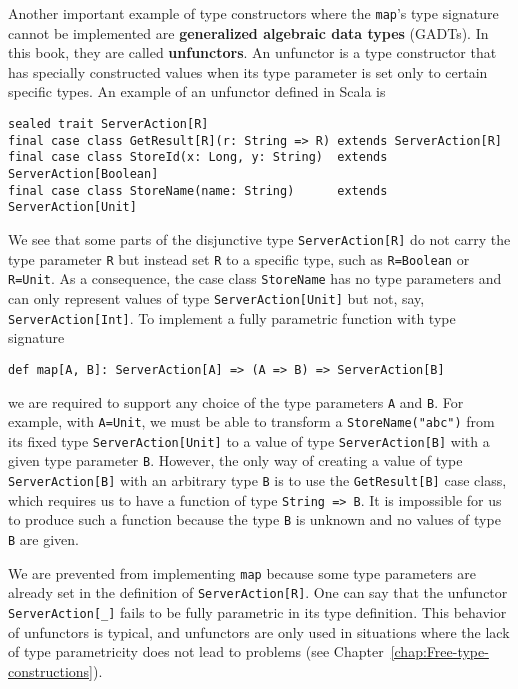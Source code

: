 Another important example of type constructors where the \lstinline!map!'s
type signature cannot be implemented are \textbf{generalized
algebraic data types} (GADTs). In this book, they are
called \textbf{unfunctors}. An unfunctor is a type
constructor that has specially constructed values when its type parameter
is set only to certain specific types. An example of an unfunctor
defined in Scala is
\begin{lstlisting}
sealed trait ServerAction[R]
final case class GetResult[R](r: String => R) extends ServerAction[R]
final case class StoreId(x: Long, y: String)  extends ServerAction[Boolean]
final case class StoreName(name: String)      extends ServerAction[Unit]
\end{lstlisting}
We see that some parts of the disjunctive type \lstinline!ServerAction[R]!
do not carry the type parameter \lstinline!R! but instead set \lstinline!R!
to a specific type, such as \lstinline!R=Boolean! or \lstinline!R=Unit!.
As a consequence, the case class \lstinline!StoreName! has no type
parameters and can only represent values of type \lstinline!ServerAction[Unit]!
but not, say, \lstinline!ServerAction[Int]!. To implement a fully
parametric function with type signature
\begin{lstlisting}
def map[A, B]: ServerAction[A] => (A => B) => ServerAction[B]
\end{lstlisting}
we are required to support any choice of the type parameters \lstinline!A!
and \lstinline!B!. For example, with \lstinline!A=Unit!, we must
be able to transform a \lstinline!StoreName("abc")! from its fixed
type \lstinline!ServerAction[Unit]! to a value of type \lstinline!ServerAction[B]!
with a given type parameter \lstinline!B!. However, the only way
of creating a value of type \lstinline!ServerAction[B]! with an arbitrary
type \lstinline!B! is to use the \lstinline!GetResult[B]! case class,
which requires us to have a function of type \lstinline!String => B!.
It is impossible for us to produce such a function because the type
\lstinline!B! is unknown and no values of type \lstinline!B! are
given. 

We are prevented from implementing \lstinline!map! because some type
parameters are already set in the definition of \lstinline!ServerAction[R]!.
One can say that the unfunctor \lstinline!ServerAction[_]! fails
to be fully parametric in its type definition. This behavior of unfunctors
is typical, and unfunctors are only used in situations where the lack
of type parametricity does not lead to problems (see Chapter~\ref{chap:Free-type-constructions}).

